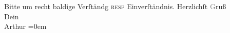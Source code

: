 \begin{ledgroupsized}[t]{13cm}
           \pstart
           Bitte um recht baldige Verſtändg \textsc{resp} Einverſtändnis.\pend
           \pstart
           Herzlichſt \textcolor{gray}{G}ruß{\\[\baselineskip]}Dein {\\[\baselineskip]}\spacefill\mbox{Arthur}\pend
           \leftskip=0em{}
         
         \endnumbering{}\end{ledgroupsized}  \newcommand{\dateiname}{L03176}\newcommand{\titel}{Arthur Schnitzler an Paul Goldmann, 30. 7. 1900}\newcommand{\editorInnen}{Martin Anton Müller und Laura Untner}
      